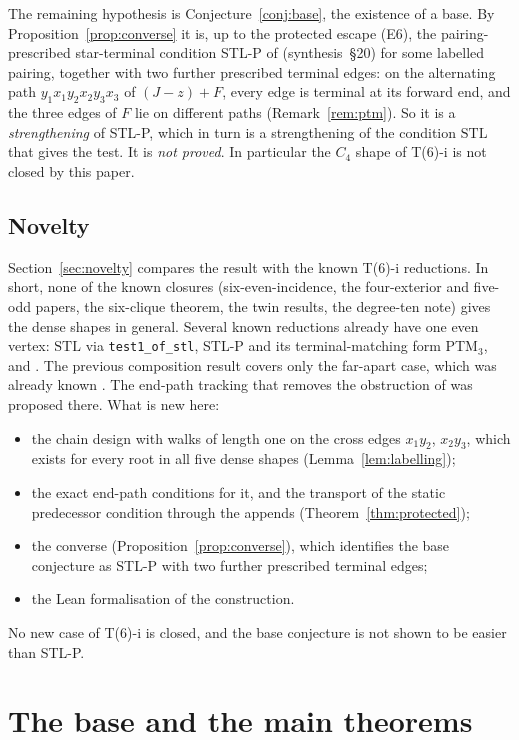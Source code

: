\documentclass[11pt]{amsart}
\theoremstyle{definition}
\newcommand{\STL}{\mathrm{STL}}
\begin{document}
The remaining hypothesis is Conjecture~\ref{conj:base}, the existence of a base. By
Proposition~\ref{prop:converse} it is, up to the protected escape (E6), the pairing-prescribed
star-terminal condition STL-P of \cite{STL} (synthesis~\S20) for some labelled pairing, together
with two further prescribed terminal edges: on the alternating path $y_1x_1y_2x_2y_3x_3$ of
$(J-z)+F$, every edge is terminal at its forward end, and the three edges of $F$ lie on
different paths (Remark~\ref{rem:ptm}). So it is a \emph{strengthening} of
STL-P, which in turn is a strengthening of the condition $\STL$ that gives the test. It is
\emph{not proved}. In particular the $C_4$ shape of T(6)-i is not closed by this paper.

\subsection*{Novelty}
Section~\ref{sec:novelty} compares the result with the known T(6)-i reductions. In short, none
of the known closures (six-even-incidence, the four-exterior and five-odd papers, the
six-clique theorem, the twin results, the degree-ten note) gives the dense shapes in general.
Several known reductions already have one even vertex: $\STL$ via \texttt{test1\_of\_stl},
STL-P and its terminal-matching form PTM$_3$, and \cite[Thm~8.2]{TM}. The previous composition
result \cite[Cor.~8.4]{TM} covers only the far-apart case, which was already known
\cite[Rem.~8.5]{TM}. The end-path tracking that removes the obstruction of \cite[\S9(1)]{TM}
was proposed there. What is new here:
\begin{itemize}
\item the chain design with walks of length one on the cross edges $x_1y_2$, $x_2y_3$, which
exists for every root in all five dense shapes (Lemma~\ref{lem:labelling});
\item the exact end-path conditions for it, and the transport of the static predecessor
condition through the appends (Theorem~\ref{thm:protected});
\item the converse (Proposition~\ref{prop:converse}), which identifies the base conjecture as
STL-P with two further prescribed terminal edges;
\item the Lean formalisation of the construction.
\end{itemize}
No new case of T(6)-i is closed, and the base conjecture is not shown to be easier than STL-P.

\section{The base and the main theorems}\label{sec:main}
\end{document}
